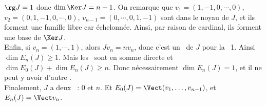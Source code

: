 $\rg J=1$ donc $\dim\Ker J=n-1$. On remarque que $v_1=(1,-1,0,\cdots,0)$, $v_2=(0,1,-1,0,\cdots,0)$, $v_{n-1}=(0,\cdots,0,1,-1)$ sont dans le noyau de $J$, et ils forment une famille libre car échelonnée. Ainsi, par raison de cardinal,  ils forment une base de $\Ker J$.\\
Enfin, si $v_n=(1,\cdots,1)$, alors $Jv_n=nv_n$, donc c'est un \vecp\ de $J$ pour la \valp\ 1. Ainsi $\dim E_n(J)\geq 1$.
Mais les \seps\ sont en somme directe et $\dim E_0(J)+\dim E_n(J)\geq n$. Donc nécessairement $\dim E_n(J)=1$, et il ne peut y avoir d'autre \valp.\\
Finalement, $J$ a deux \valps\ : $0$ et $n$. Et $E_0(J)=\Vect(v_1,\ldots,v_{n-1})$, et $E_n(J)=\Vect v_n$.



